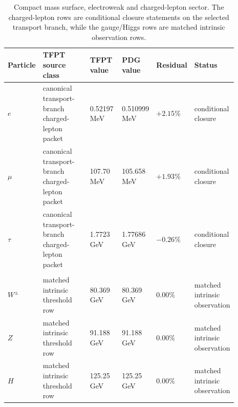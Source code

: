 \begin{table}[p]
\centering
\scriptsize
\setlength{\tabcolsep}{3pt}
\begin{tabularx}{\linewidth}{@{}>{\raggedright\arraybackslash}p{0.10\linewidth}>{\raggedright\arraybackslash}p{0.27\linewidth}>{\raggedleft\arraybackslash}p{0.15\linewidth}>{\raggedleft\arraybackslash}p{0.15\linewidth}>{\raggedleft\arraybackslash}p{0.10\linewidth}>{\raggedright\arraybackslash}p{0.12\linewidth}@{}}
\toprule
Particle & TFPT source class & TFPT value & PDG value & Residual & Status \\
\midrule
$e$ & canonical transport-branch charged-lepton packet & \num{0.52197} MeV & \num{0.510999} MeV & $+2.15\%$ & conditional closure \\
$\mu$ & canonical transport-branch charged-lepton packet & \num{107.70} MeV & \num{105.658} MeV & $+1.93\%$ & conditional closure \\
$\tau$ & canonical transport-branch charged-lepton packet & \num{1.7723} GeV & \num{1.77686} GeV & $-0.26\%$ & conditional closure \\
\midrule
\multicolumn{6}{@{}l}{\textit{Matched intrinsic observation surface:}} \\
$W^\pm$ & matched intrinsic threshold row & \num{80.369} GeV & \num{80.369} GeV & $0.00\%$ & matched intrinsic observation \\
$Z$ & matched intrinsic threshold row & \num{91.188} GeV & \num{91.188} GeV & $0.00\%$ & matched intrinsic observation \\
$H$ & matched intrinsic threshold row & \num{125.25} GeV & \num{125.25} GeV & $0.00\%$ & matched intrinsic observation \\
\bottomrule
\end{tabularx}
\caption{Compact mass surface, electroweak and charged-lepton sector. The charged-lepton rows are conditional closure statements on the selected transport branch, while the gauge/Higgs rows are matched intrinsic observation rows.}
\label{tab:sm-mass-ledger-ew}
\end{table}

